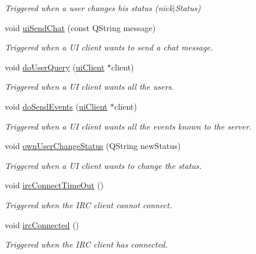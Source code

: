 \begin{DoxyCompactItemize}
\begin{DoxyCompactList}\small\item\em Triggered when a user changes his status (nick$|$\-Status) \end{DoxyCompactList}\item 
void \hyperlink{classserver_1_1main_app_a022d0310199da514b250fec2541ada4a}{ui\-Send\-Chat} (const Q\-String message)
\begin{DoxyCompactList}\small\item\em Triggered when a U\-I client wants to send a chat message. \end{DoxyCompactList}\item 
void \hyperlink{classserver_1_1main_app_aea819e4b8f297de7f1e3fc2f8513b0a4}{do\-User\-Query} (\hyperlink{classserver_1_1ui_client}{ui\-Client} $\ast$client)
\begin{DoxyCompactList}\small\item\em Triggered when a U\-I client wants all the users. \end{DoxyCompactList}\item 
void \hyperlink{classserver_1_1main_app_aba9c03c1c353a57f43404bb149bee50b}{do\-Send\-Events} (\hyperlink{classserver_1_1ui_client}{ui\-Client} $\ast$client)
\begin{DoxyCompactList}\small\item\em Triggered when a U\-I client wants all the events known to the server. \end{DoxyCompactList}\item 
void \hyperlink{classserver_1_1main_app_af498e3b109e1bc2b9f8e87b215efdb27}{own\-User\-Change\-Status} (Q\-String new\-Status)
\begin{DoxyCompactList}\small\item\em Triggered when a U\-I client wants to change the status. \end{DoxyCompactList}\item 
void \hyperlink{classserver_1_1main_app_a931aedd34bb38252acfc8880f9716fab}{irc\-Connect\-Time\-Out} ()
\begin{DoxyCompactList}\small\item\em Triggered when the I\-R\-C client cannot connect. \end{DoxyCompactList}\item 
void \hyperlink{classserver_1_1main_app_a6e6e952e3048cfeefcdfeea7bbb5b83e}{irc\-Connected} ()
\begin{DoxyCompactList}\small\item\em Triggered when the I\-R\-C client has connected. \end{DoxyCompactList}\item 

\end{DoxyCompactItemize}
